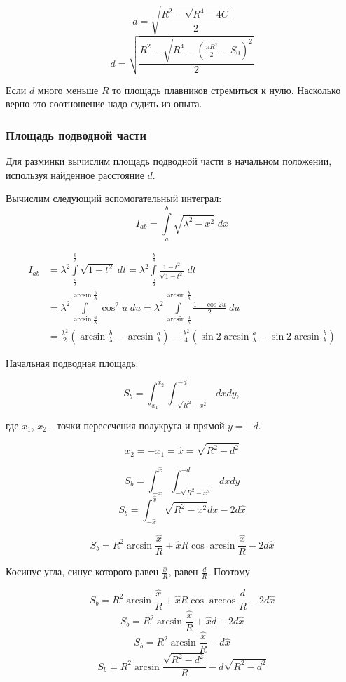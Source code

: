 \documentclass[a4paper]{article}
\begin{document}
$$ d = \sqrt{\frac{R^2 - \sqrt{R^4-4C}}{2}} $$
$$ d = \sqrt{\frac{R^2 - \sqrt{R^4-(\frac{\pi R^2}{2} - S_0)^2}}{2}} $$

Если $d$ много меньше $R$ то площадь плавников стремиться к нулю. Насколько верно это соотношение надо судить из опыта.

\subsubsection{Площадь подводной части}

Для разминки вычислим площадь подводной части в начальном положении, используя найденное расстояние $d$. 

Вычислим следующий вспомогательный интеграл:
$$ I_{ab} = \int\limits_a^b \sqrt{\lambda^2 - x^2}\;dx $$

\begin{align*}
	I_{ab} &= \lambda^2 \int\limits_\frac{a}{\lambda}^\frac{b}{\lambda} \sqrt{1 - t^2}\;dt 
	= \lambda^2 \int\limits_\frac{a}{\lambda}^\frac{b}{\lambda} \frac{1 - t^2}{\sqrt{1 - t^2}}\;dt \\
	&= \lambda^2 \int\limits_{\arcsin\frac{a}{\lambda}}^{\arcsin\frac{b}{\lambda}} \cos^2u\;du 
	= \lambda^2 \int\limits_{\arcsin\frac{a}{\lambda}}^{\arcsin\frac{b}{\lambda}} \frac{1-\cos2u}{2}\;du \\
	&= \frac{\lambda^2}{2}(\arcsin\frac{b}{\lambda} - \arcsin\frac{a}{\lambda}) - \frac{\lambda^2}{4}(\sin 2\arcsin\frac{a}{\lambda} - \sin 2\arcsin\frac{b}{\lambda}) 
\end{align*}

Начальная подводная площадь:

$$ S_b = \int_{x_1}^{x_2} \int_{-\sqrt{R^2-x^2}}^{-d} dx dy, $$

где $x_1$, $x_2$ - точки пересечения полукруга и прямой $y=-d$. 

$$ x_2 = -x_1 = \hat{x} =\sqrt{R^2 - d^2} $$

$$ S_b = \int_{-\hat{x}}^{\hat{x}} \int_{-\sqrt{R^2-x^2}}^{-d} dx dy $$
$$ S_b = \int_{-\hat{x}}^{\hat{x}} \sqrt{R^2-x^2} dx - 2d\hat{x} $$

$$ S_b = R^2 \arcsin\frac{\hat{x}}{R} + \hat{x}R\cos\arcsin\frac{\hat{x}}{R} - 2d\hat{x} $$

Косинус угла, синус которого равен $\frac{\hat{x}}{R}$, равен $\frac{d}{R}$. Поэтому

$$ S_b = R^2 \arcsin\frac{\hat{x}}{R} + \hat{x}R\cos\arccos\frac{d}{R} - 2d\hat{x} $$
$$ S_b = R^2 \arcsin\frac{\hat{x}}{R} + \hat{x}d - 2d\hat{x} $$
$$ S_b = R^2 \arcsin\frac{\hat{x}}{R} - d\hat{x} $$
$$ S_b = R^2 \arcsin\frac{\sqrt{R^2-d^2}}{R} - d\sqrt{R^2-d^2} $$
\end{document}
